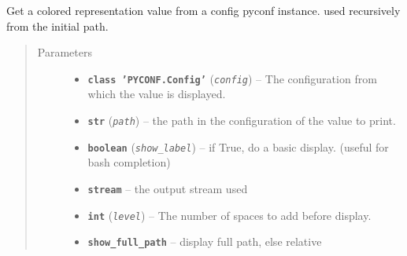\documentclass[a4paper,10pt,english]{sphinxmanual}
\begin{document}

\begin{fulllineitems}
\label{commands/apidoc/src:src.configManager.getConfigColored}
Get a colored representation value from a config pyconf instance.
used recursively from the initial path.
\begin{quote}\begin{description}
\item[{Parameters}] \leavevmode\begin{itemize}
\item {} 
\textbf{\texttt{class 'PYCONF.Config'}} (\emph{\texttt{config}}) -- The configuration from which the value is displayed.

\item {} 
\textbf{\texttt{str}} (\emph{\texttt{path}}) -- the path in the configuration of the value to print.

\item {} 
\textbf{\texttt{boolean}} (\emph{\texttt{show\_label}}) -- if True, do a basic display. (useful for bash completion)

\item {} 
\textbf{\texttt{stream}} -- the output stream used

\item {} 
\textbf{\texttt{int}} (\emph{\texttt{level}}) -- The number of spaces to add before display.

\item {} 
\textbf{\texttt{show\_full\_path}} -- display full path, else relative

\end{itemize}

\end{description}\end{quote}

\end{fulllineitems}

\end{document}
